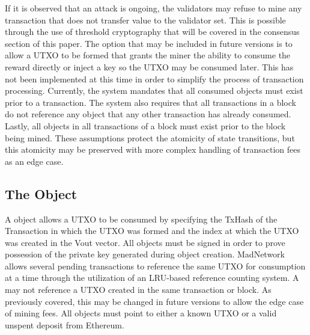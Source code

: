 If it is observed that an attack is ongoing, the validators may refuse
to mine any transaction that does not transfer value to the validator
set.
This is possible through the use of threshold cryptography that will be
covered in the consensus section of this paper.
The option that may be included in future versions is to allow a UTXO
to be formed that grants the miner the ability to consume the reward
directly or inject a key so the UTXO may be consumed later.
This has not been implemented at this time in order to simplify the
process of transaction processing.
Currently, the system mandates that all consumed objects must exist
prior to a transaction.
The system also requires that all transactions in a block do not
reference any object that any other transaction has already consumed.
Lastly, all objects in all transactions of a block must exist prior to
the block being mined.
These assumptions protect the atomicity of state transitions, but this
atomicity may be preserved with more complex handling of transaction
fees as an edge case.


\subsection{The \TxIn{} Object}



A \TxIn{} object allows a UTXO to be consumed by specifying the TxHash of
the Transaction in which the UTXO was formed and the index at which the
UTXO was created in the Vout vector.
All \TxIn{} objects must be signed in order to prove possession of the
private key generated during object creation.
MadNetwork allows several pending transactions to reference the same
UTXO for consumption at a time through the utilization of an LRU-based
reference counting system.
A \TxIn{} may not reference a UTXO created in the same transaction or
block.
As previously covered, this may be changed in future versions to allow
the edge case of mining fees.
All \TxIn{} objects must point to either a known UTXO or a valid unspent
deposit from Ethereum.

